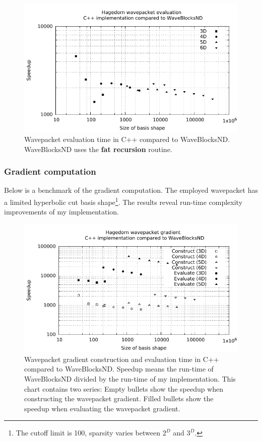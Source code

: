 \documentclass{article}
\begin{document}
\begin{figure}[H]
  \centering
  \includegraphics[width=1.0\textwidth]{plots/hawp_eval_cvp_fat}
  \caption{Wavepacket evaluation time in C++ compared to WaveBlocksND.
  WaveBlocksND uses the \textbf{fat recursion} routine.}
  \label{fig:hawp_eval_cvp_fat}
\end{figure}

\subsubsection{Gradient computation}

Below is a benchmark of the gradient computation. The employed wavepacket
has a limited hyperbolic cut basis shape\footnote{
  The cutoff limit is 100, sparsity varies between \(2^D\) and \(3^D\).}.
The results reveal run-time complexity improvements of my implementation.

\begin{figure}[H]
  \centering
  \includegraphics[width=1.0\textwidth]{plots/grad_eval_cvp}
  \caption{
    Wavepacket gradient construction and evaluation time in C++ compared to WaveBlocksND.
    Speedup means the run-time of WaveBlocksND divided by the run-time of my implementation.
    This chart contains two series: Empty bullets show the speedup when constructing
    the wavepacket gradient. Filled bullets show the speedup when evaluating the
    wavepacket gradient.
  }
  \label{fig:grad_eval_cvp}
\end{figure}
\end{document}
